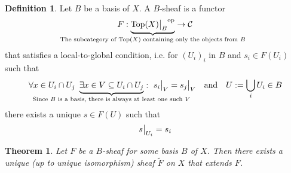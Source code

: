 \documentclass{scrartcl}
\newcommand{\Top}{\mathrm{Top}}
\newcommand\restr[2]{{
    \left.\kern-\nulldelimiterspace
    #1
    \vphantom{\big|}
    \right|_{#2}
}}
\newtheorem{theorem}[prop]{Theorem}
\theoremstyle{definition}
\newtheorem{definition}[prop]{Definition}
\begin{document}
\begin{definition}
    Let $B$ be a basis of $X$.
    A $B$-sheaf is a functor
    \begin{equation*}
        F: \underbrace{\restr{\Top(X)}{B}^{\mathrm{op}}}_{\mathclap{\text{The subcategory of $\Top(X)$ containing only the objects from $B$}}} \to \mathcal{C}
    \end{equation*}
    that satisfies a local-to-global condition, i.e. for $(U_i)_i$ in $B$ and $s_i \in F(U_i)$ such that
    \begin{equation*}
        \forall x \in U_i \cap U_j \ \underbrace{\exists x \in V \subseteq U_i \cap U_j}_{\mathclap{\text{Since $B$ is a basis, there is always at least one such $V$}}}: \ \restr{s_i}{V} = \restr{s_j}{V} \quad \text{and} \quad U := \bigcup_i U_i \in B
    \end{equation*}
    there exists a unique $s \in F(U)$ such that
    \begin{equation*}
        \restr{s}{U_i} = s_i
    \end{equation*}
\end{definition}
\begin{theorem}
    \label{prop:extend_b_sheaves}
    Let $F$ be a $B$-sheaf for some basis $B$ of $X$.
    Then there exists a unique (up to unique isomorphism) sheaf $\tilde{F}$ on $X$ that extends $F$.
\end{theorem}
\end{document}
